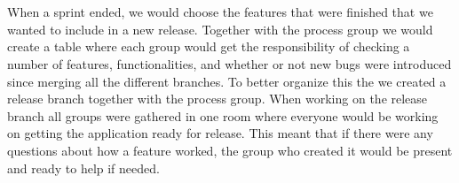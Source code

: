 \\
\\
When a sprint ended, we would choose the features that were finished that we wanted to include in a new release.
Together with the process group we would create a table where each group would get the responsibility of checking a number of features, functionalities, and whether or not new bugs were introduced since merging all the different branches.
To better organize this the we created a release branch together with the process group.
When working on the release branch all groups were gathered in one room where everyone would be working on getting the application ready for release.
This meant that if there were any questions about how a feature worked, the group who created it would be present and ready to help if needed.
